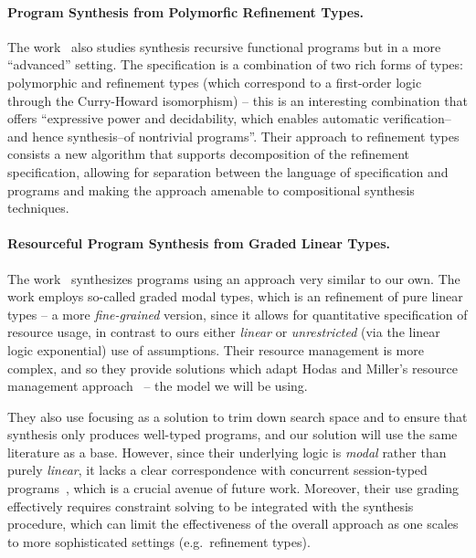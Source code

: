 \documentclass{llncs}
\newcommand{\mypara}[1]{\paragraph{\textbf{#1}.}}
\begin{document}
  
\mypara{Program Synthesis from Polymorfic Refinement Types} The
work~\cite{DBLP:conf/pldi/PolikarpovaKS16} also studies synthesis
recursive functional programs but in a more ``advanced'' setting. The
specification is a combination of two rich forms of types: polymorphic and
refinement types (which correspond to a first-order logic through the
Curry-Howard isomorphism) -- this is an interesting combination that offers
``expressive power and decidability, which enables automatic
verification--and hence synthesis--of nontrivial programs''.  Their
approach to refinement types consists a new algorithm that supports
decomposition of the refinement specification, allowing for separation
between the language of specification and programs and making the
approach amenable to compositional synthesis techniques.

\mypara{Resourceful Program Synthesis from Graded Linear Types} The
work~\cite{DBLP:conf/lopstr/HughesO20} synthesizes programs using an
approach very similar to our own.  The work employs so-called graded
modal types, which is an refinement of pure linear types -- a more
\emph{fine-grained} version, since it allows for quantitative
specification of resource usage, in contrast to ours either
\emph{linear} or \emph{unrestricted} (via the linear logic
exponential) use of assumptions.  Their resource management is more
complex, and so they provide solutions which adapt Hodas and Miller's
resource management
approach~\cite{DBLP:journals/tcs/CervesatoHP00,DBLP:journals/tcs/LiangM09}
-- the model we will be using.

They also use focusing as a solution to trim down search space and to
ensure that synthesis only produces well-typed programs, and our
solution will use the same literature as a base.  However, since their
underlying logic is \emph{modal} rather than purely \emph{linear}, it
lacks a clear correspondence with concurrent session-typed
programs~\cite{DBLP:journals/mscs/CairesPT16,DBLP:conf/concur/CairesP10},
which is a crucial avenue of future work. Moreover, their use grading
effectively requires constraint solving to be integrated with the
synthesis procedure, which can limit the effectiveness of the overall
approach as one scales to more sophisticated settings (e.g.~refinement
types).

\end{document}

